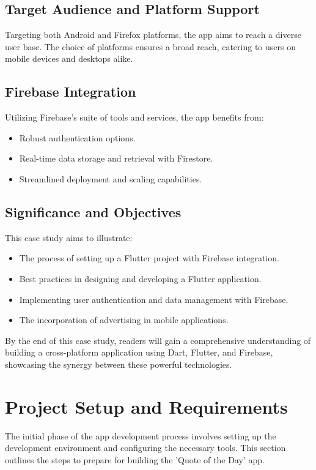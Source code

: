 \documentclass{book}
\begin{document}
\subsection{Target Audience and Platform Support}
Targeting both Android and Firefox platforms, the app aims to reach a diverse user base. The choice of platforms ensures a broad reach, catering to users on mobile devices and desktops alike.

\subsection{Firebase Integration}
Utilizing Firebase's suite of tools and services, the app benefits from:
\begin{itemize}
    \item Robust authentication options.
    \item Real-time data storage and retrieval with Firestore.
    \item Streamlined deployment and scaling capabilities.
\end{itemize}

\subsection{Significance and Objectives}
This case study aims to illustrate:
\begin{itemize}
    \item The process of setting up a Flutter project with Firebase integration.
    \item Best practices in designing and developing a Flutter application.
    \item Implementing user authentication and data management with Firebase.
    \item The incorporation of advertising in mobile applications.
\end{itemize}

By the end of this case study, readers will gain a comprehensive understanding of building a cross-platform application using Dart, Flutter, and Firebase, showcasing the synergy between these powerful technologies.

\section{Project Setup and Requirements}
The initial phase of the app development process involves setting up the development environment and configuring the necessary tools. This section outlines the steps to prepare for building the 'Quote of the Day' app.
\end{document}
